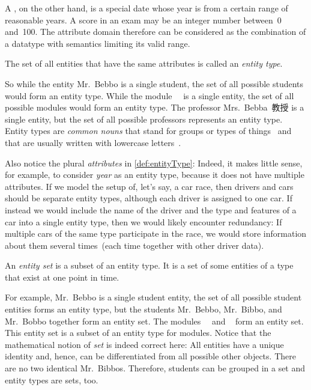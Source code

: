 A , on the other hand, is a special date whose year is from a certain range of reasonable years.
A score in an exam may be an integer number between~0 and~100.
The attribute domain therefore can be considered as the combination of a datatype with semantics limiting its valid range.%
%
\begin{definition}%
\label{def:entityType}%
The set of all entities that have the same attributes is called an \emph{entity type}.%
\end{definition}%
%
So while the entity Mr.~Bebbo is a single student, the set of all possible students would form an entity type.
While the module~~\cite{programmingWithPython} is a single entity, the set of all possible modules would form an entity type.
The professor Mrs.~Bebba~教授 is a single entity, but the set of all possible professors represents an entity type.
Entity types are \emph{common nouns} that stand for groups or types of things~\cite{C1997ECAED} and that are usually written with lowercase letters~\cite{EOWM2025MWAMTD:CAPNWTDLWOGC}.

Also notice the plural \emph{attributes} in \cref{def:entityType}:%
%
%
Indeed, it makes little sense, for example, to consider \emph{year} as an entity type, because it does not have multiple attributes.%
%
%
%
If we model the setup of, let's say, a car race, then drivers and cars should be separate entity types, although each driver is assigned to one car.
If instead we would include the name of the driver and the type and features of a car into a single entity type, then we would likely encounter redundancy:
If multiple cars of the same type participate in the race, we would store information about them several times~(each time together with other driver data).%
%
\begin{definition}%
An \emph{entity set} is a subset of an entity type. %
It is a set of some entities of a type that exist at one point in time.%
\end{definition}%
%
For example, Mr.~Bebbo is a single student entity, the set of all possible student entities forms an entity type, but the students Mr.~Bebbo, Mr.~Bibbo, and Mr.~Bobbo together form an entity set.
The modules~~\cite{programmingWithPython} and ~\cite{databases} form an entity set.
This entity set is a subset of an entity type for modules.
Notice that the mathematical notion of \emph{set} is indeed correct here:
All entities have a unique identity and, hence, can be differentiated from all possible other objects.
There are no two identical Mr.~Bibbos.
Therefore, students can be grouped in a set and entity types are sets, too.

